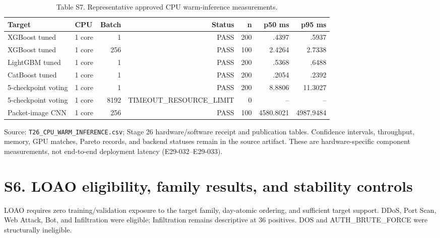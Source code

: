 \documentclass[preprint,12pt]{elsarticle}
\begin{document}
\begin{table}[htbp]
\centering\tiny
\caption{Table S7. Representative approved CPU warm-inference measurements.}
\begin{tabular}{@{}llrrrrr@{}}
\toprule
Target & CPU & Batch & Status & n & p50 ms & p95 ms\\
\midrule
XGBoost tuned & 1 core & 1 & PASS & 200 & .4397 & .5937\\
XGBoost tuned & 1 core & 256 & PASS & 100 & 2.4264 & 2.7338\\
LightGBM tuned & 1 core & 1 & PASS & 200 & .5368 & .6488\\
CatBoost tuned & 1 core & 1 & PASS & 200 & .2054 & .2392\\
5-checkpoint voting & 1 core & 1 & PASS & 200 & 8.8806 & 11.3027\\
5-checkpoint voting & 1 core & 8192 & TIMEOUT\_RESOURCE\_LIMIT & 0 & -- & --\\
Packet-image CNN & 1 core & 256 & PASS & 100 & 4580.8021 & 4987.9484\\
\bottomrule
\end{tabular}
\end{table}
Source: \texttt{T26\_CPU\_WARM\_INFERENCE.csv}; Stage 26 hardware/software receipt and publication tables. Confidence intervals, throughput, memory, GPU matches, Pareto records, and backend statuses remain in the source artifact. These are hardware-specific component measurements, not end-to-end deployment latency (E29-032--E29-033).

\section*{S6. LOAO eligibility, family results, and stability controls}
LOAO requires zero training/validation exposure to the target family, day-atomic ordering, and sufficient target support. DDoS, Port Scan, Web Attack, Bot, and Infiltration were eligible; Infiltration remains descriptive at 36 positives. DOS and AUTH\_BRUTE\_FORCE were structurally ineligible.
\end{document}
